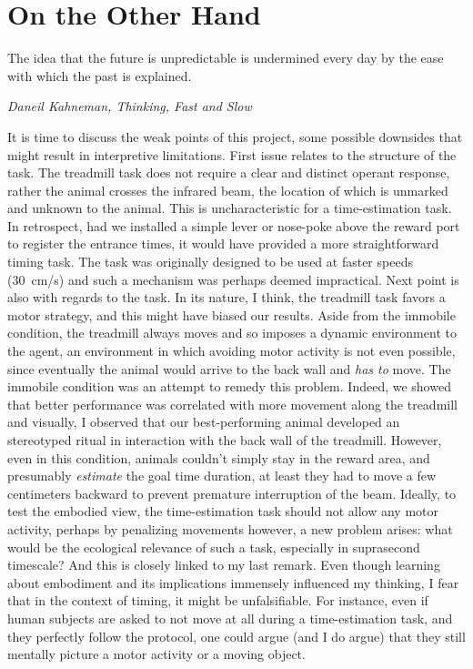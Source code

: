 \section{On the Other Hand}
\epigraph{The idea that the future is unpredictable is undermined every day by the ease with which the past is explained.}
{\textit{Daneil Kahneman, Thinking, Fast and Slow}}
\noindent
It is time to discuss the weak points of this project, some possible downsides that might result in interpretive limitations.
First issue relates to the structure of the task.
The treadmill task does not require a clear and distinct operant response, rather the animal crosses the infrared beam, the location of which is unmarked and unknown to the animal.
This is uncharacteristic for a time-estimation task.
In retrospect, had we installed a simple lever or nose-poke above the reward port to register the entrance times, it would have provided a more straightforward timing task.
The task was originally designed to be used at faster speeds (30~cm/s) and such a mechanism was perhaps deemed impractical.
Next point is also with regards to the task.
In its nature, I think, the treadmill task favors a motor strategy, and this might have biased our results.
Aside from the immobile condition, the treadmill always moves and so imposes a dynamic environment to the agent, an environment in which avoiding motor activity is not even possible, since eventually the animal would arrive to the back wall and \textit{has to} move.
The immobile condition was an attempt to remedy this problem.
Indeed, we showed that better performance was correlated with more movement along the treadmill and visually, I observed that our best-performing animal developed an stereotyped ritual in interaction with the back wall of the treadmill.
However, even in this condition, animals couldn't simply stay in the reward area, and presumably \textit{estimate} the goal time duration, at least they had to move a few centimeters backward to prevent premature interruption of the beam.
Ideally, to test the embodied view, the time-estimation task should not allow any motor activity, perhaps by penalizing movements however, a new problem arises:
what would be the ecological relevance of such a task, especially in suprasecond timescale?
And this is closely linked to my last remark.
Even though learning about embodiment and its implications immensely influenced my thinking, I fear that in the context of timing, it might be unfalsifiable.
For instance, even if human subjects are asked to not move at all during a time-estimation task, and they perfectly follow the protocol, one could argue (and I do argue) that they still mentally picture a motor activity or a moving object.
